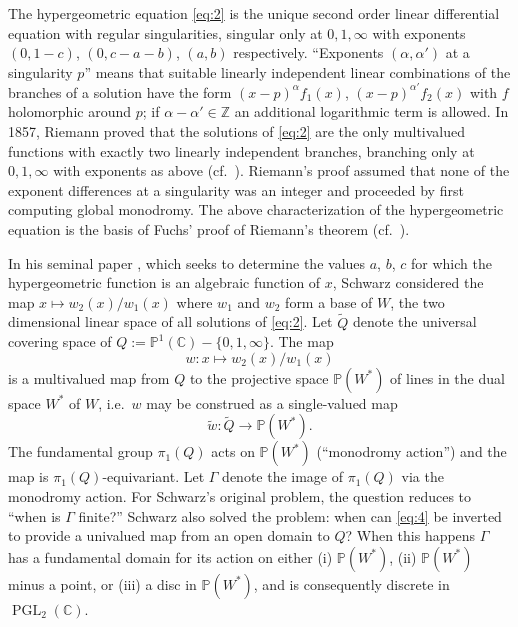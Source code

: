 \documentclass[12pt,a4paper]{article}
\theoremstyle{plain}
\theoremstyle{definition}
\theoremstyle{remark}
\DeclareMathOperator{\PGL}{PGL}
\newcommand{\CC}{\mathbb{C}}
\newcommand{\PP}{\mathbb{P}}
\newcommand{\ZZ}{\mathbb{Z}}
\numberwithin{equation}{section}
\providecommand{\CC}{\mathbb{C}}
\providecommand{\PP}{\mathbb{P}}
\providecommand{\ZZ}{\mathbb{Z}}
\providecommand{\PGL}{\operatorname{PGL}}
\begin{document}
The hypergeometric equation \eqref{eq:2} is the unique second order linear differential equation with regular singularities, singular only at $0, 1, \infty$ with exponents $(0, 1-c)$, $(0, c-a-b)$, $(a, b)$ respectively. ``Exponents $(\alpha, \alpha')$ at a singularity $p$'' means that suitable linearly independent linear combinations of the branches of a solution have the form $(x-p)^\alpha f_1(x)$, $(x-p)^{\alpha'} f_2(x)$ with $f$ holomorphic around $p$; if $\alpha - \alpha' \in \ZZ$ an additional logarithmic term is allowed. In 1857, Riemann proved that the solutions of \eqref{eq:2} are the only multivalued functions with exactly two linearly independent branches, branching only at $0, 1, \infty$ with exponents as above (cf.\ \cite{Riemann}). Riemann's proof assumed that none of the exponent differences at a singularity was an integer and proceeded by first computing global monodromy. The above characterization of the hypergeometric equation is the basis of Fuchs' proof of Riemann's theorem (cf.\ \cite{Fuchs}).

In his seminal paper \cite{Schwarz}, which seeks to determine the values $a$, $b$, $c$ for which the hypergeometric function is an algebraic function of $x$, Schwarz considered the map $x \mapsto w_2(x)/w_1(x)$ where $w_1$ and $w_2$ form a base of $W$, the two dimensional linear space of all solutions of \eqref{eq:2}. Let $\widetilde{Q}$ denote the universal covering space of $Q := \PP^1(\CC) - \{0, 1, \infty\}$. The map
\begin{equation}\label{eq:4}
w : x \mapsto w_2(x)/w_1(x)
\end{equation}
is a multivalued map from $Q$ to the projective space $\PP(W^*)$ of lines in the dual space $W^*$ of $W$, i.e.\ $w$ may be construed as a single-valued map
\begin{equation}\label{eq:4p}
\widetilde{w} : \widetilde{Q} \to \PP(W^*).
\end{equation}
The fundamental group $\pi_1(Q)$ acts on $\PP(W^*)$ (``monodromy action'') and the map is $\pi_1(Q)$-equivariant. Let $\Gamma$ denote the image of $\pi_1(Q)$ via the monodromy action. For Schwarz's original problem, the question reduces to ``when is $\Gamma$ finite?'' Schwarz also solved the problem: when can \eqref{eq:4} be inverted to provide a univalued map from an open domain to $Q$? When this happens $\Gamma$ has a fundamental domain for its action on either (i) $\PP(W^*)$, (ii) $\PP(W^*)$ minus a point, or (iii) a disc in $\PP(W^*)$, and is consequently discrete in $\PGL_2(\CC)$.
\end{document}
